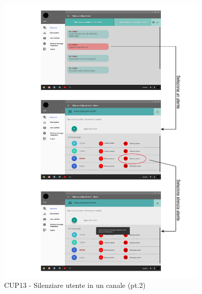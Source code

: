 \begin{figure}
	\centering
	\includegraphics[width=0.9\textwidth]{imgs/gruppo6/activities/act_cup13_silenziare_utente2.pdf}
	\caption{CUP13 - Silenziare utente in un canale (pt.2)}
	\label{fig:act-cup13-2}
\end{figure}

